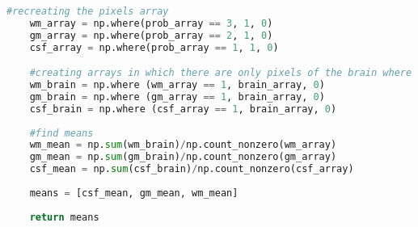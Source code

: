 \documentclass{standalone}
\begin{document}
\begin{lstlisting}[language=python, caption = Parameters Estimation, label=parameters]
    #recreating the pixels array
    wm_array = np.where(prob_array == 3, 1, 0)
    gm_array = np.where(prob_array == 2, 1, 0)
    csf_array = np.where(prob_array == 1, 1, 0)

    #creating arrays in which there are only pixels of the brain where those pixels are of that class
    wm_brain = np.where (wm_array == 1, brain_array, 0)
    gm_brain = np.where (gm_array == 1, brain_array, 0)
    csf_brain = np.where (csf_array == 1, brain_array, 0)
    
    #find means
    wm_mean = np.sum(wm_brain)/np.count_nonzero(wm_array)
    gm_mean = np.sum(gm_brain)/np.count_nonzero(gm_array)
    csf_mean = np.sum(csf_brain)/np.count_nonzero(csf_array)
    
    means = [csf_mean, gm_mean, wm_mean]
        
    return means
\end{lstlisting}
\end{document}
